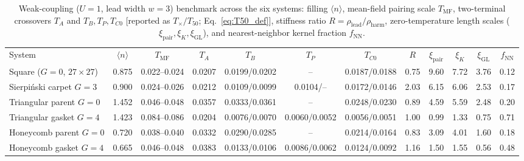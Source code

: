 \documentclass[aps,prb,twocolumn,superscriptaddress,floatfix]{revtex4-2}
\newcommand{\Tmf}{T_{\mathrm{MF}}}
\newcommand{\rlead}{\rho_{\mathrm{lead}}}
\begin{document}
\begin{table}[t]
\caption{Weak-coupling ($U=1$, lead width $w=3$) benchmark across the six systems: filling $\langle n\rangle$, mean-field pairing scale $\Tmf$, two-terminal crossovers $T_A$ and $T_B, T_P, T_{C0}$ [reported as $T_\times / T_{50}$; Eq.~\eqref{eq:T50_def}], stiffness ratio $R = \rlead/\rho_{\mathrm{harm}}$, zero-temperature length scales ($\xi_{\mathrm{pair}}, \xi_K, \xi_{\mathrm{GL}}$), and nearest-neighbor kernel fraction $f_{\mathrm{NN}}$.}
\label{tab:u1}
\footnotesize
\begin{ruledtabular}
\setlength{\tabcolsep}{2.0pt}
\begin{tabular}{lccccccccccc}
System & $\langle n \rangle$ & $\Tmf$ & $T_A$ & $T_B$ & $T_P$ & $T_{C0}$ & $R$ & $\xi_{\mathrm{pair}}$ & $\xi_K$ & $\xi_{\mathrm{GL}}$ & $f_{\mathrm{NN}}$ \\
\colrule
Square ($G=0$, $27\times 27$) & 0.875 & 0.022--0.024 & 0.0207 & 0.0199/0.0202 & -- & 0.0187/0.0188 & 0.75 & 9.60 & 7.72 & 3.76 & 0.12 \\
Sierpi\'nski carpet $G=3$ & 0.900 & 0.024--0.026 & 0.0212 & 0.0109/0.0099 & 0.0104/-- & 0.0172/0.0146 & 2.03 & 6.15 & 6.06 & 2.53 & 0.17 \\
Triangular parent $G=0$ & 1.452 & 0.046--0.048 & 0.0357 & 0.0333/0.0361 & -- & 0.0248/0.0230 & 0.89 & 4.59 & 5.59 & 2.48 & 0.20 \\
Triangular gasket $G=4$ & 1.423 & 0.084--0.086 & 0.0204 & 0.0076/0.0070 & 0.0060/0.0052 & 0.0056/0.0051 & 1.00 & 0.99 & 1.33 & 0.75 & 0.71 \\
Honeycomb parent $G=0$ & 0.720 & 0.038--0.040 & 0.0332 & 0.0290/0.0285 & -- & 0.0214/0.0164 & 0.83 & 3.09 & 4.01 & 1.60 & 0.18 \\
Honeycomb gasket $G=4$ & 0.665 & 0.046--0.048 & 0.0383 & 0.0133/0.0106 & 0.0086/0.0062 & 0.0124/0.0092 & 1.16 & 1.50 & 1.55 & 0.56 & 0.48 \\
\end{tabular}
\end{ruledtabular}
\end{table}
\end{document}
